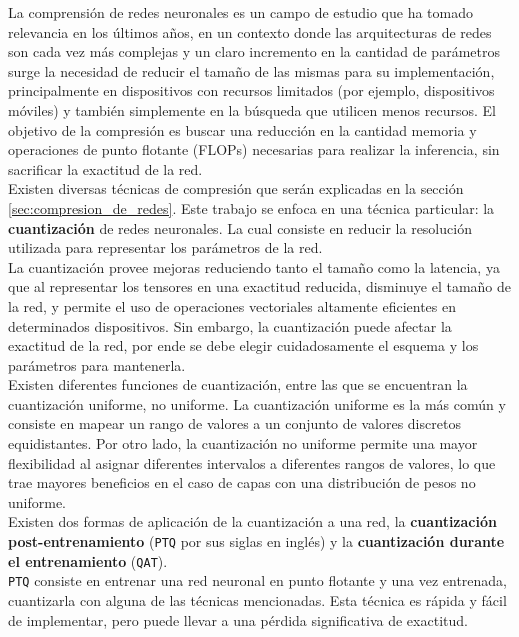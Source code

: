 La comprensión de redes neuronales es un campo de estudio que ha tomado relevancia en los últimos años, en un contexto donde las arquitecturas de redes son cada vez más complejas y un claro incremento en la cantidad de parámetros surge la necesidad de reducir el tamaño de las mismas para su implementación, principalmente en dispositivos con recursos limitados (por ejemplo, dispositivos móviles) y también simplemente en la búsqueda que utilicen menos recursos. El objetivo de la compresión es buscar una reducción en la cantidad memoria y operaciones de punto flotante (FLOPs) necesarias para realizar la inferencia, sin sacrificar la exactitud de la red. \\

Existen diversas técnicas de compresión que serán explicadas en la sección \ref{sec:compresion_de_redes}. Este trabajo se enfoca en una técnica particular: la \textbf{cuantización} de redes neuronales. La cual consiste en reducir la resolución utilizada para representar los parámetros de la red. \\

La cuantización provee mejoras reduciendo tanto el tamaño como la latencia, ya que al representar los tensores en una exactitud reducida, disminuye el tamaño de la red, y permite el uso de operaciones vectoriales altamente eficientes en determinados dispositivos. Sin embargo, la cuantización puede afectar la exactitud de la red, por ende se debe elegir cuidadosamente el esquema y los parámetros para mantenerla. \\

Existen diferentes funciones de cuantización, entre las que se encuentran la cuantización uniforme, no uniforme. La cuantización uniforme es la más común y consiste en mapear un rango de valores a un conjunto de valores discretos equidistantes. Por otro lado, la cuantización no uniforme permite una mayor flexibilidad al asignar diferentes intervalos a diferentes rangos de valores, lo que trae mayores beneficios en el caso de capas con una distribución de pesos no uniforme. \\

Existen dos formas de aplicación de la cuantización a una red, la \textbf{cuantización post-entrenamiento} (\texttt{PTQ} por sus siglas en inglés) y la \textbf{cuantización durante el entrenamiento} (\texttt{QAT}). \\

\texttt{PTQ} consiste en entrenar una red neuronal en punto flotante y una vez entrenada, cuantizarla con alguna de las técnicas mencionadas. Esta técnica es rápida y fácil de implementar, pero puede llevar a una pérdida significativa de exactitud. \\


